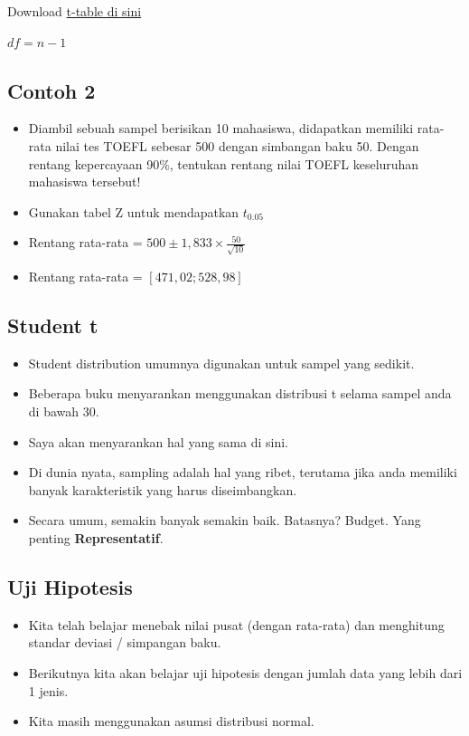 \documentclass[
  letterpaper,
  DIV=11,
  numbers=noendperiod]{scrartcl}
\begin{document}
Download
\href{https://1drv.ms/b/s!AjelszXKKcmsifhDr8cYIgeuMVSIDw?e=ioiSHv}{t-table
di sini}

\(df=n-1\)

\hypertarget{contoh-2-2}{%
\subsection{Contoh 2}\label{contoh-2-2}}

\begin{itemize}
\item
  Diambil sebuah sampel berisikan 10 mahasiswa, didapatkan memiliki
  rata-rata nilai tes TOEFL sebesar 500 dengan simbangan baku 50. Dengan
  rentang kepercayaan 90\%, tentukan rentang nilai TOEFL keseluruhan
  mahasiswa tersebut!
\item
  Gunakan tabel Z untuk mendapatkan \(t_{0.05}\)
\item
  Rentang rata-rata = \(500 \pm 1,833\times\frac{50}{\sqrt{10}}\)
\item
  Rentang rata-rata = \(\left[471,02;528,98\right]\)
\end{itemize}

\hypertarget{student-t}{%
\subsection{Student t}\label{student-t}}

\begin{itemize}
\item
  Student distribution umumnya digunakan untuk sampel yang sedikit.
\item
  Beberapa buku menyarankan menggunakan distribusi t selama sampel anda
  di bawah 30.
\item
  Saya akan menyarankan hal yang sama di sini.
\item
  Di dunia nyata, sampling adalah hal yang ribet, terutama jika anda
  memiliki banyak karakteristik yang harus diseimbangkan.
\item
  Secara umum, semakin banyak semakin baik. Batasnya? Budget. Yang
  penting \textbf{Representatif}.
\end{itemize}

\hypertarget{uji-hipotesis}{%
\subsection{Uji Hipotesis}\label{uji-hipotesis}}

\begin{itemize}
\item
  Kita telah belajar menebak nilai pusat (dengan rata-rata) dan
  menghitung standar deviasi / simpangan baku.
\item
  Berikutnya kita akan belajar uji hipotesis dengan jumlah data yang
  lebih dari 1 jenis.
\item
  Kita masih menggunakan asumsi distribusi normal.
\end{itemize}
\end{document}
